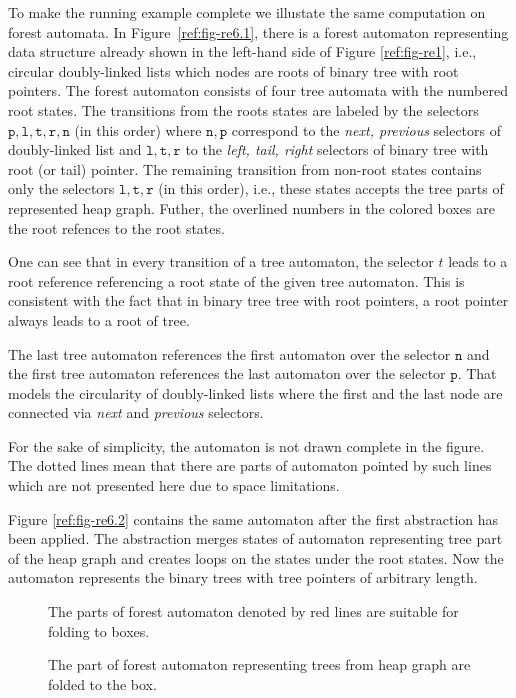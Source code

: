 {To make the running example complete we illustate the same computation on forest automata.
In Figure~\ref{ref:fig-re6.1}, there is a forest automaton representing data structure
already shown in the left-hand side of Figure \ref{ref:fig-re1}, i.e., circular doubly-linked lists which
nodes are roots of binary tree with root pointers.
The forest automaton consists of four tree automata with the numbered root states.
The transitions from the roots states are labeled by the selectors $\mathtt{p,l,t,r,n}$ (in this order)
where $\mathtt{n,p}$ correspond to the \emph{next, previous} selectors of doubly-linked list
and $\mathtt{l,t,r}$ to the \emph{left, tail, right} selectors of binary tree with root (or tail) pointer.
The remaining transition from non-root states contains only the selectors $\mathtt{l,t, r}$ (in this order),
i.e., these states accepts the tree parts of represented heap graph.
Futher, the overlined numbers in the colored boxes are the root refences to the root states.

One can see that in every transition of a tree automaton, the selector $t$ leads to a root reference
referencing a root state of the given tree automaton.
This is consistent with the fact that in binary tree tree with root pointers, a root pointer always leads
to a root of tree.

The last tree automaton references the first automaton over the selector $\mathtt{n}$ and
the first tree automaton references the last automaton over the selector $\mathtt{p}$.
That models the circularity of doubly-linked lists where the first and the last node are
connected via \emph{next} and \emph{previous} selectors.
 
For the sake of simplicity, the automaton is not drawn complete in the figure.
The dotted lines mean that there are parts of automaton pointed by such lines which are not presented
here due to space limitations.

Figure \ref{ref:fig-re6.2} contains the same automaton after the first abstraction has been applied.
The abstraction merges states of automaton representing tree part of the heap graph and creates
loops on the states under the root states.
Now the automaton represents the binary trees with tree pointers of arbitrary length.

\begin{figure}[bt]
\begin{center}
      
\caption{The parts of forest automaton denoted by red lines are suitable for folding to boxes.}
\label{ref:fig-re7.1}
      
\caption{The part of forest automaton representing trees from heap graph are folded to the box.}
\label{ref:fig-re7.2}
\end{center}
\end{figure}

}
